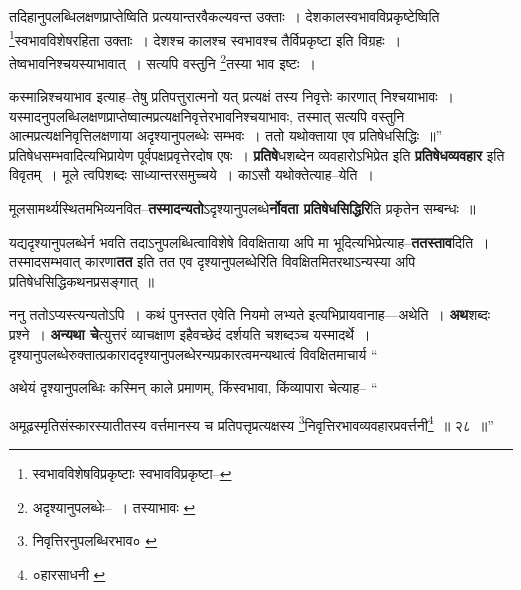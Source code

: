 \documentclass[article,12pt,a4paper]{memoir}
\begin{document}
	तदिहानुपलब्धिलक्षणप्राप्तेष्विति प्रत्ययान्तरवैकल्यवन्त उक्ताः । देशकालस्वभावविप्रकृष्टेष्विति \footnote{स्वभावविशेषविप्रकृष्टाः \cite{dp-msA} \cite{dp-edP} \cite{dp-edH} \cite{dp-edE} \cite{dp-edN} स्वभावविप्रकृष्टा--\cite{dp-msC}}स्वभावविशेषरहिता उक्ताः । देशश्च कालश्च स्वभावश्च तैर्विप्रकृष्टा इति विग्रहः । तेष्वभावनिश्चयस्याभावात् । सत्यपि वस्तुनि \footnote{अदृश्यानुपलब्धेः--\cite{dp-msD-n} । तस्याभावः \cite{dp-edP} \cite{dp-edH} \cite{dp-edE} \cite{dp-edN}}तस्या भाव इष्टः । 
	  
	कस्मान्निश्चयाभाव इत्याह--तेषु प्रतिपत्तुरात्मनो यत् प्रत्यक्षं तस्य निवृत्तेः कारणात् निश्चयाभावः । यस्मादनुपलब्धिलक्षणप्राप्तेष्वात्मप्रत्यक्षनिवृत्तेरभावनिश्चयाभावः, तस्मात् सत्यपि वस्तुनि आत्मप्रत्यक्षनिवृत्तिलक्षणाया अदृश्यानुपलब्धेः सम्भवः । ततो यथोक्ताया एव प्रतिषेधसिद्धिः ॥” प्रतिषेधसम्भवादित्यभिप्रायेण पूर्वपक्षप्रवृत्तेरदोष एषः । \textbf{प्रतिषे}धशब्देन व्यवहारोऽभिप्रेत इति \textbf{प्रतिषेधव्यवहार} इति विवृतम् । मूले त्वपिशब्दः साध्यान्तरसमुच्चये । काऽसौ यथोक्तेत्याह--येति ।
	\pend
      

	  \pstart मूलसामर्थ्यस्थितमभिव्यनवित--\textbf{तस्मादन्यतो}ऽदृश्यानुपलब्धे\textbf{र्नोवता प्रतिषेधसिद्धिरि}ति प्रकृतेन सम्बन्धः ॥
	\pend
      

	  \pstart यद्यदृश्यानुपलब्धेर्न भवति तदाऽनुपलब्धित्वाविशेषे विवक्षिताया अपि मा भूदित्यभिप्रेत्याह--\textbf{ततस्ताव}दिति । तस्मादसम्भवात् कारणा\textbf{तत} इति तत एव दृश्यानुपलब्धेरिति विवक्षितमितरथाऽन्यस्या अपि प्रतिषेधसिद्धिकथनप्रसङ्गात् ॥
	\pend
      

	  \pstart ननु ततोऽप्यस्त्यन्यतोऽपि । कथं पुनस्तत एवेति नियमो लभ्यते इत्यभिप्रायवानाह—अथेति । \textbf{अथ}शब्दः प्रश्ने । \textbf{अन्यथा चे}त्युत्तरं व्याचक्षाण इहैवच्छेदं दर्शयति चशब्दञ्च यस्मादर्थे । दृश्यानुपलब्धेरुक्तात्प्रकाराददृश्यानुपलब्धेरन्यप्रकारत्वमन्यथात्वं विवक्षितमाचार्य  \leavevmode{} “
	  
	अथेयं दृश्यानुपलब्धिः कस्मिन् काले प्रमाणम्, किंस्वभावा, किंव्यापारा चेत्याह-- “
	  
	अमूढस्मृतिसंस्कारस्यातीतस्य वर्त्तमानस्य च प्रतिपत्तृप्रत्यक्षस्य \footnote{निवृत्तिरनुपलब्धिरभाव० \cite{dp-msC} \cite{dp-msD}}निवृत्तिरभावव्यवहारप्रवर्त्तनी\footnote{०हारसाधनी \cite{dp-msB} \cite{dp-msC} \cite{dp-msD} \cite{dp-edP} \cite{dp-edH} \cite{dp-edE} \cite{dp-edN}} ॥ २८ ॥” 
	  
\end{document}
